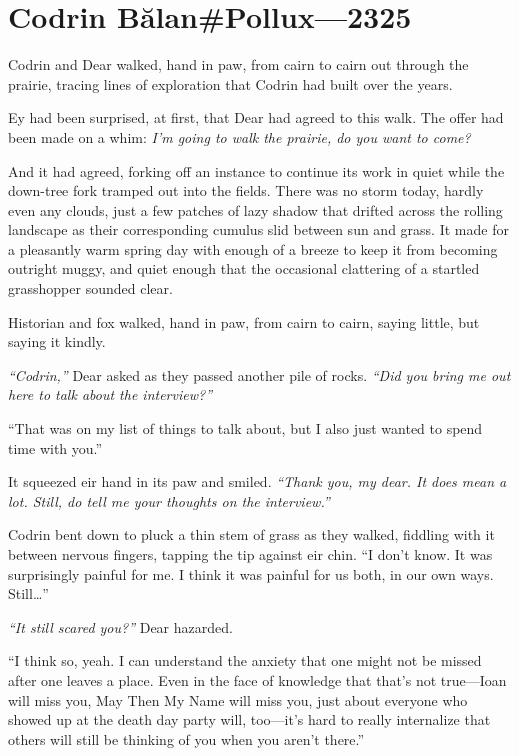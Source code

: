 \hypertarget{codrin-bux103lanpollux-2325}{%
\chapter{Codrin Bălan\#Pollux—2325}\label{codrin-bux103lanpollux-2325}}

Codrin and Dear walked, hand in paw, from cairn to cairn out through the prairie, tracing lines of exploration that Codrin had built over the years.

Ey had been surprised, at first, that Dear had agreed to this walk. The offer had been made on a whim: \emph{I'm going to walk the prairie, do you want to come?}

And it had agreed, forking off an instance to continue its work in quiet while the down-tree fork tramped out into the fields. There was no storm today, hardly even any clouds, just a few patches of lazy shadow that drifted across the rolling landscape as their corresponding cumulus slid between sun and grass. It made for a pleasantly warm spring day with enough of a breeze to keep it from becoming outright muggy, and quiet enough that the occasional clattering of a startled grasshopper sounded clear.

Historian and fox walked, hand in paw, from cairn to cairn, saying little, but saying it kindly.

\emph{``Codrin,''} Dear asked as they passed another pile of rocks. \emph{``Did you bring me out here to talk about the interview?''}

``That was on my list of things to talk about, but I also just wanted to spend time with you.''

It squeezed eir hand in its paw and smiled. \emph{``Thank you, my dear. It does mean a lot. Still, do tell me your thoughts on the interview.''}

Codrin bent down to pluck a thin stem of grass as they walked, fiddling with it between nervous fingers, tapping the tip against eir chin. ``I don't know. It was surprisingly painful for me. I think it was painful for us both, in our own ways. Still\ldots{}''

\emph{``It still scared you?''} Dear hazarded.

``I think so, yeah. I can understand the anxiety that one might not be missed after one leaves a place. Even in the face of knowledge that that's not true---Ioan will miss you, May Then My Name will miss you, just about everyone who showed up at the death day party will, too---it's hard to really internalize that others will still be thinking of you when you aren't there.''

